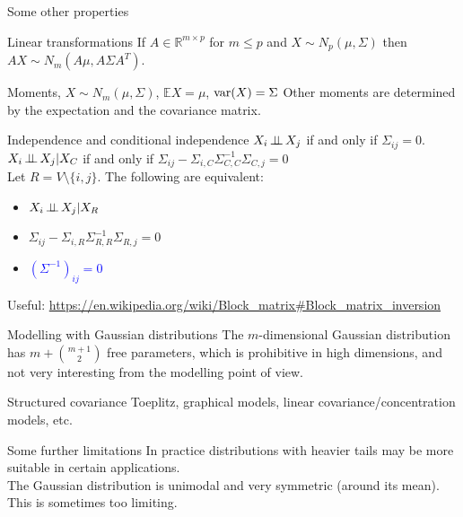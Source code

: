 \documentclass[dvipsnames,aspectratio=169]{beamer} %
\newcommand{\E}{\mathbb{E}}
\newcommand{\R}{\mathbb{R}}
\newcommand{\indep}{\mbox{\,$\perp\!\!\!\perp$\,}}
\begin{document}
\begin{frame}{Some other properties}
	\begin{alertblock}{Linear transformations}
		If $A\in \R^{m\times p}$ for $m\leq p$ and $X\sim N_p(\mu,\Sigma)$ then $AX\sim N_m(A\mu,A\Sigma A^T)$.
	\end{alertblock}
\begin{alertblock}{Moments, $X\sim N_m(\mu,\Sigma)$, $\E X=\mu$, ${\rm var}(X)=\Sigma$}
Other moments are determined by the expectation and the covariance matrix.
\end{alertblock}
\begin{alertblock}{Independence and conditional independence}
$X_i\indep X_j$ if and only if $\Sigma_{ij}=0$.\\[.3cm]
$X_i\indep X_j|X_{C}$\;\; if and only if \;\; $\Sigma_{ij}-\Sigma_{i,C}\Sigma_{C,C}^{-1}\Sigma_{C,j}=0$\\[.3cm]
Let $R=V\setminus \{i,j\}$. The following are equivalent:
\begin{itemize}
	\item $X_i\indep X_j|X_{R}$
	\item $\Sigma_{ij}-\Sigma_{i,R}\Sigma_{R,R}^{-1}\Sigma_{R,j}=0$
	\item \textcolor{blue}{$(\Sigma^{-1})_{ij}=0$}
\end{itemize}
\end{alertblock}
{\tiny Useful: \url{https://en.wikipedia.org/wiki/Block_matrix\#Block_matrix_inversion}}
\end{frame}


\begin{frame}{Modelling with Gaussian distributions}
	The $m$-dimensional Gaussian distribution has $m+{m+1\choose 2}$ free parameters, which is prohibitive in high dimensions, and not very interesting from the modelling point of view.\\[.3cm]
	\begin{alertblock}{Structured covariance}
		Toeplitz, graphical models, linear covariance/concentration models, etc.
	\end{alertblock}
\begin{alertblock}{Some further limitations}
In practice distributions with heavier tails may be more suitable in certain applications.\\[.3cm] 
	The Gaussian distribution is unimodal and very symmetric (around its mean). This is sometimes too limiting.
\end{alertblock}
\end{frame}
\end{document}
